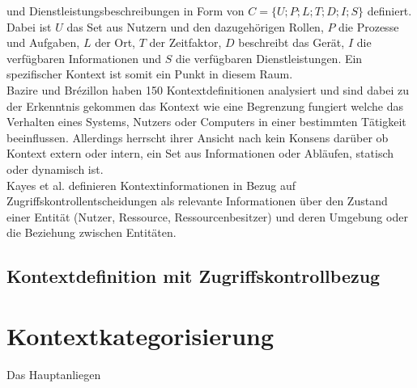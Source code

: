 und Dienstleistungsbeschreibungen in Form von $C = \{U;P;L;T;D;I;S\}$ definiert.
Dabei ist $U$ das Set aus Nutzern und den dazugehörigen Rollen, $P$ die Prozesse und Aufgaben, $L$ der Ort, $T$ der Zeitfaktor, $D$ beschreibt das Gerät, $I$ die verfügbaren Informationen und $S$ die verfügbaren Dienstleistungen.
Ein spezifischer Kontext ist somit ein Punkt in diesem Raum.\\
Bazire und Brézillon \cite{hutchison_understanding_2005} haben 150 Kontextdefinitionen analysiert und sind dabei zu der Erkenntnis gekommen das Kontext wie eine Begrenzung fungiert welche das Verhalten eines Systems, Nutzers oder Computers in einer bestimmten Tätigkeit beeinflussen.
Allerdings herrscht ihrer Ansicht nach kein Konsens darüber ob Kontext extern oder intern, ein Set aus Informationen oder Abläufen, statisch oder dynamisch ist.\\

Kayes et al.\cite{kayes_icaf_2012} definieren Kontextinformationen in Bezug auf Zugriffskontrollentscheidungen als relevante Informationen über den Zustand einer Entität (Nutzer, Ressource, Ressourcenbesitzer) und deren Umgebung oder die Beziehung zwischen Entitäten.


\subsection{Kontextdefinition mit Zugriffskontrollbezug}
\section{Kontextkategorisierung}
Das Hauptanliegen 

